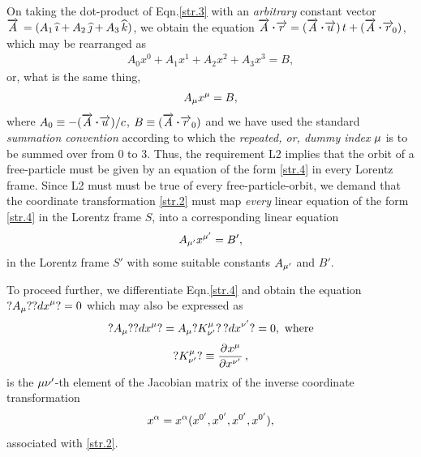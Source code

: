 \begin{small}
On taking the dot-product of Eqn.\eqref{str.3} with an 
\textsl{arbitrary} constant vector $\overrightarrow{A}\,= 
(A_1\,{\widehat{\imath}} + A_2\,{\widehat{\jmath}} + A_3\,{\widehat{k}})$, we obtain the 
equation  $\vec{A}\, \dotp \vec{r} =(\vec{A}\,\dotp 
\vec{u}) \,t + (\vec{A}\, \dotp \vec{r}_{\nt 0})$, 
which may be rearranged as
\begin{align*}
A_0x^0+A_1x^1+A_2x^2+A_3x^3=B,
\end{align*}
or, what is the same thing, 
\begin{align}\label{str.4}
A_{{\mu}} x^{{\mu}} =B,
\end{align} 
where  $A_0 \equiv - (\vec{A}\,\dotp \vec{u})/c$, $B\equiv 
(\vec{A}\, \dotp \vec{r}_{0})$ and we have used the standard
\textsl{summation convention} according to which the 
\textsl{repeated, or, dummy index} ${\mu}$ is to be 
summed over from $0$ to $3$. Thus, the requirement L2 
implies that the orbit of a free-particle must be given by 
an equation of the form \eqref{str.4} in every Lorentz 
frame. Since L2 must must be true of every 
free-particle-orbit, we demand that the coordinate 
transformation \eqref{str.2} must map \textsl{every} linear 
equation of the form \eqref{str.4} in the Lorentz frame 
$S$, into a corresponding linear equation
\begin{align}\label{str.5}
{A}_{{\mu}'} x^{{\mu}'} = {B}',
\end{align}
in the Lorentz frame $S'$ with some suitable constants 
${A}_{{\mu}'}$ and $B'$. 

To proceed further, we differentiate Eqn.\eqref{str.4} and
obtain the equation  $?A_{{\mu}}? ?{dx}^{{\mu}}?=0$ which may 
also be expressed as 
\begin{align}\label{str.6}
?A_{{\mu}}? ?{dx}^{{\mu}}? 
={A}_{{\mu}}?{K}^{{\mu}}_{{\nu'}}?\,?{dx}^{{\nu'}}? = 
0, \text{ where} 
\end{align}
\begin{align}\label{str.7}
?K^\gkm_\gknp?\equiv \pdx{\gkm}{\gknp},
\end{align}
is the ${\mu}{\nu'}$-th element of the Jacobian matrix of the
inverse coordinate transformation
\begin{align*}
x^{{\alpha}} =x^{{\alpha}} (x^{{0'}},x^{{0'}},x^{{0'}},x^{{0'}}),
\end{align*}
associated with \eqref{str.2}. 


\end{small}
